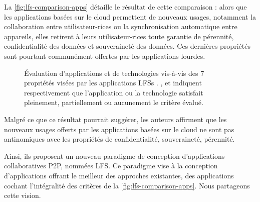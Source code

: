 La \autoref{fig:lfs-comparison-apps} détaille le résultat de cette comparaison : alors que les applications basées sur le cloud permettent de nouveaux usages, notamment la collaboration entre utilisateur-rices ou la synchronisation automatique entre appareils, elles retirent à leurs utilisateur-rices toute garantie de pérennité, confidentialité des données et souveraineté des données.
Ces dernières propriétés sont pourtant communément offertes par les applications lourdes.

\begin{figure}[!ht]
  \centering
  \caption[Caption for lfs-comparison-apps]{
    Évaluation d'applications et de technologies vis-à-vis des 7 propriétés visées par les applications \aclp{LFS} \cite{localfirstsoftware2019}.
    {\color{lfsgreen} \checked}, {\color{lfsorange} \Flatsteel} et {\scriptsize \color{lfsred} } indiquent respectivement que l'application ou la technologie satisfait pleinement, partiellement ou aucunement le critère évalué.
  }
  \label{fig:lfs-comparison-apps}
\end{figure}

Malgré ce que ce résultat pourrait suggérer, les auteurs affirment que les nouveaux usages offerts par les applications basées sur le cloud ne sont pas antinomiques avec les propriétés de confidentialité, souveraineté, pérennité.

Ainsi, ils proposent un nouveau paradigme de conception d'applications collaboratives \ac{P2P}, nommées \ac{LFS}.
Ce paradigme vise à la conception d'applications offrant le meilleur des approches existantes, \ie des applications cochant l'intégralité des critères de la \autoref{fig:lfs-comparison-apps}.
Nous partageons cette vision.\\

